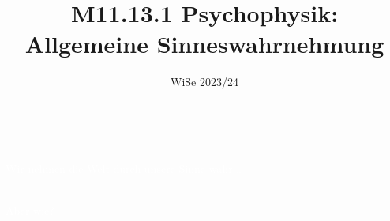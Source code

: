 \documentclass{beamer}
\title[M11.13.1 Psychophysik]{M11.13.1 Psychophysik: \\ Allgemeine Sinneswahrnehmung}
\author[melanie.stefan@medicalschool-berlin.de]{}
\institute[]{Prof. Melanie Stefan \\ melanie.stefan@medcialschool-berlin.de}
\date{WiSe 2023/24}
\begin{document}
{  
\begin{frame}

 \maketitle 

$\,$\\[6cm] 


\end{frame} 
}



{  
\begin{frame}
\textcolor{white}{Wir nehmen die Welt durch unsere Sinne wahr \dots}

$\,$\\[3.5cm]

\pause
\textcolor{white}{Aber wie?}

$\,$\\[4cm]

\end{frame}
}
\end{document}
